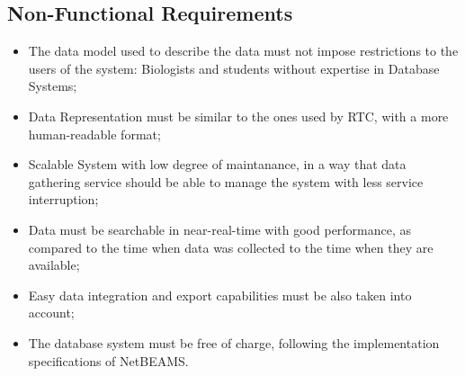 \subsection{Non-Functional Requirements}

\begin{itemize}
  \item The data model used to describe the data must not impose restrictions
  to the users of the system: Biologists and students without expertise in
  Database Systems;
  \item Data Representation must be similar to the ones used by RTC,
  with a more human-readable format;
  \item Scalable System with low degree of maintanance, in a way that data
  gathering service should be able to manage the system with less service
  interruption;
  \item Data must be searchable in near-real-time with good performance, as
  compared to the time when data was collected to the time when they are available;
  \item Easy data integration and export capabilities must be also taken into
  account;
  \item The database system must be free of charge, following the
  implementation specifications of NetBEAMS.
\end{itemize}